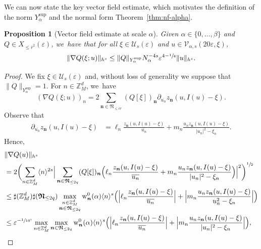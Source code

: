\documentclass[10pt,a4paper]{amsart}
\theoremstyle{plain}
\newtheorem{proposition}[theorem]{Proposition}
\theoremstyle{definition}
\newcommand{\nb}{{\boldsymbol n}}
\newcommand{\Nb}{{\boldsymbol{\mathfrak{N}}}}
\newcommand{\Z}{\mathbb{Z}}
\newcommand{\1}{\mathbf{1}}
\newcommand{\Ysup}[1]{Y_{#1}^{\mathrm{sup}}}
\let\epsilon\varepsilon
\begin{document}
We can now state the key vector field estimate, which motivates the definition of the norm $\Ysup{\alpha}$ and the normal form Theorem~\ref{thm:nf-alpha}.

\begin{proposition}[Vector field estimate at scale $\alpha$]\label{prop:vec-alpha}
Given $\alpha\in\{0,\dots,\beta\}$ and $Q\in X_{\leq\overline{r}^{2}}(\epsilon)$, we~have that for all $\xi\in\mathcal{U}_{s}(\epsilon)$
and $u\in\mathcal{V}_{\alpha,s}(20\epsilon,\xi)$,
\begin{equation}
\label{eq:vec-alpha}
\|\nabla Q(\xi;u)\|_{h^{s}}\leq \|Q\|_{\Ysup{\alpha}} N_{\alpha}^{-4s}\epsilon^{4-\sfrac{1}{4}}\|u\|_{h^{s}}.
\end{equation}
\end{proposition}

\begin{proof} We fix $\xi\!\in\!\mathcal{U}_{s}(\epsilon)$ and, without loss of generality we suppose that \hbox{$\|Q\|_{\Ysup{\alpha}}\!=\!1$}. For $n\in\Z_{M}^{d}$, we~have
\[
(\nabla Q(\xi;u))_{n} = 2\sum_{\nb\in\Nb_{\leq cr}}(Q[\xi])_{\nb}\partial_{\overline{u_{n}}}z_{\nb}(u,I(u)-\xi).
\]
Observe that
\begin{align*}
\partial_{\overline{u_{n}}}z_{\nb}(u,I(u)-\xi)
&= \ell_{n}\frac{z_{\nb}(u,I(u)-\xi)}{\overline{u_{n}}} + m_{n}\frac{u_{n}z_{\nb}(u,I(u)-\xi)}{|u_{n}|^{2}-\xi_{n}}.
\end{align*}
Hence,
\begin{equation*}
\begin{split}
&\|\nabla Q(u)\|_{h^{s}}\\
&= 2\biggl(\sum_{n\in\Z_{M}^{d}}\langle n\rangle^{2s}\Big|\sum_{\nb\in\Nb_{\leq 2q}}(Q[\xi])_{\nb}\Big(\ell_{n}\frac{z_{\nb}(u,I(u)-\xi)}{\overline{u_{n}}}+m_{n}\frac{u_{n}z_{\nb}(u,I(u)-\xi)}{|u_{n}|^{2}-\xi_{n}}\Big)\Big|^{2}\biggr)^{\sfrac{1}{2}} \\
&\leq \sharp(\Z_{M}^{d})\sharp(\Nb_{\leq2q})\max_{\substack{n\in\Z_{M}^{d}\\ \nb\in\Nb_{\leq 2q}}}
\operatorname{w}_{\nb}^{0}(\alpha)\langle n\rangle^{s}
\Big(\Bigl|\ell_{n}\frac{z_{\nb}(u,I(u)-\xi)}{\overline{u_{n}}}\Bigr|+\Bigl|m_{n}\frac{u_{n}z_{\nb}(u,I(u)-\xi)}{u_{n}^{2}-\xi_{n}}\Bigr|
\Big) \\
&\leq \epsilon^{-\sfrac{1}{10^{4}}}\max_{n\in\Z_{M}^{d}}
\max_{\nb\in\Nb_{\leq2q}}
\operatorname{w}_{\nb}^{0}(\alpha)\langle n\rangle^{s}\Big(\Bigl|\ell_{n}\frac{z_{\nb}(u,I(u)-\xi)}{\overline{u_{n}}}\Bigr|+\Bigl|m_{n}\frac{u_{n}z_{\nb}(u,I(u)-\xi)}{|u_n|^{2}-\xi_{n}}\Bigr|\Big),

\end{split}
\end{equation*}
\end{proof}
\end{document}

